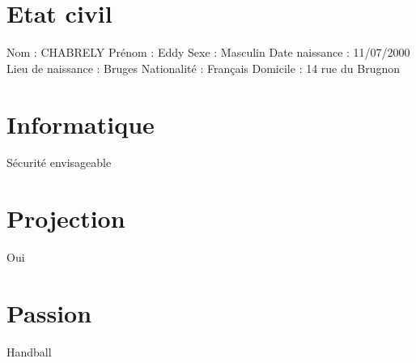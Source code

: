 \documentclass{article}
\begin{document}
\section{Etat civil}
Nom : CHABRELY
\newline
Prénom : Eddy
\newline
Sexe : Masculin
\newline
Date naissance : 11/07/2000
\newline
Lieu de naissance : Bruges 
\newline
Nationalité : Français
\newline
Domicile : 14 rue du Brugnon


\section{Informatique}
Sécurité envisageable

\section{Projection}
Oui

\section{Passion}
Handball
\end{document}
